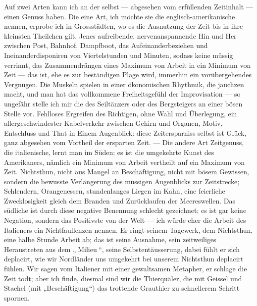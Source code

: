 Auf zwei Arten kann ich an der  selbst — abgesehen vom erfüllenden Zeitinhalt — einen Genuss haben. Die eine Art, ich möchte sie die englisch-amerikanische nennen, erprobe ich in Grossstädten, wo es die Ausnutzung der Zeit bis in ihre kleinsten Theilchen gilt. Jenes aufreibende, nervenanspannende Hin und Her zwischen Post, Bahnhof, Dampfboot, das Aufeinanderbeziehen und Ineinanderdisponiren von Viertelstunden und Minuten, sodass keine müssig verrinnt, das Zusammendrängen eines Maximum von Arbeit in ein Minimum von Zeit — das ist, ehe es zur beständigen Plage wird, immerhin ein vorübergehendes Vergnügen. Die Muskeln spielen in einer ökonomischen Rhythmik, die jauchzen macht, und man hat das vollkommene Freiheitsgefühl der Improvisation — so ungefähr stelle ich mir die  des Seiltänzers oder des Bergsteigers an einer bösen Stelle vor. Fehlloses Ergreifen des Richtigen, ohne Wahl und Überlegung, ein allergeschwindester Kabelverkehr zwischen Gehirn und Organen, Motiv, Entschluss und That in Einem Augenblick: diese Zeitersparniss selbst ist Glück, ganz abgesehen vom Vortheil der ersparten Zeit. — Die andere Art Zeitgenuss, die italienische, lernt man im Süden; es ist die umgekehrte Kunst des Amerikaners, nämlich ein Minimum von Arbeit vertheilt auf ein Maximum von Zeit. Nichtsthun, nicht aus Mangel an Beschäftigung, nicht mit bösem Gewissen, sondern die bewusste Verlängerung des müssigen Augenblicks zur Zeitstrecke; Schlendern, Orangenessen, stundenlanges Liegen im Kahn, eine feierliche Zwecklosigkeit gleich dem Branden und Zurücklaufen der Meereswellen. Das südliche  ist durch diese negative Benennung schlecht gezeichnet; es ist gar keine Negation, sondern das Positivste von der Welt — ich würde eher die Arbeit des Italieners ein Nichtfaullenzen nennen. Er ringt seinem Tagewerk, dem Nichtsthun, eine halbe Stunde Arbeit ab; das ist seine Ausnahme, sein zeitweiliges Heraustreten aus dem „ Milieu “, seine Selbstentäusserung, dabei fühlt er sich deplacirt, wie wir Nordländer uns umgekehrt bei unserem Nichtsthun deplacirt fühlen. Wir sagen vom Italiener mit einer gewaltsamen Metapher, er schlage die Zeit todt; aber ich finde, diesmal sind wir die Thierquäler, die mit Geissel und Stachel (mit „Beschäftigung“) das trottende Grauthier zu schnellerem Schritt spornen.
\par

